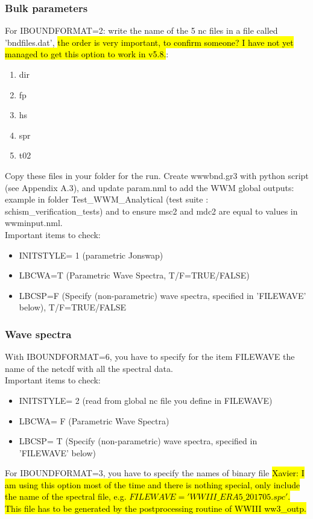 \documentclass[preprints,briefreport,accept,oneauthor,pdftex]{Definitions/mdpi}
\begin{document}
\subsubsection{Bulk parameters}
\noindent For IBOUNDFORMAT=2: write the name of the 5 nc files in a file called 'bndfiles.dat', \hl{the order is very important, to confirm someone? I have not yet managed to get this option to work in v5.8.}: \begin{enumerate}
    \item dir
    \item fp
    \item hs
    \item spr
    \item t02
\end{enumerate}
Copy these files in your folder for the run. Create wwwbnd.gr3 with python script (see Appendix A.3), and update param.nml to add the WWM global outputs: example in folder Test\_WWM\_Analytical (test suite : schism\_verification\_tests) and to ensure msc2 and mdc2 are equal to values in wwminput.nml.\\
Important items to check:
\begin{itemize}
    \item INITSTYLE= 1 (parametric Jonswap)
    \item LBCWA=T (Parametric Wave Spectra, T/F=TRUE/FALSE)
    \item LBCSP=F (Specify (non-parametric) wave spectra, specified in 'FILEWAVE' below),  T/F=TRUE/FALSE
\end{itemize}
\subsubsection{Wave spectra}
\noindent With IBOUNDFORMAT=6, you have to specify for the item FILEWAVE the name of the netcdf with all the spectral data.\\
Important items to check:
\begin{itemize}
   \item INITSTYLE= 2 (read from global nc file you define in FILEWAVE)
    \item LBCWA= F (Parametric Wave Spectra)
    \item LBCSP= T (Specify (non-parametric) wave spectra, specified in 'FILEWAVE' below)
\end{itemize}

For IBOUNDFORMAT=3, you have to specify the names of binary file \hl{ Xavier: I am using this option most of the time and there is nothing special, only include the name of the spectral file, e.g. $FILEWAVE       = 'WWIII\_ERA5\_201705.spc'$. This file has to be generated by the postprocessing routine of WWIII ww3\_outp.}
\end{document}
